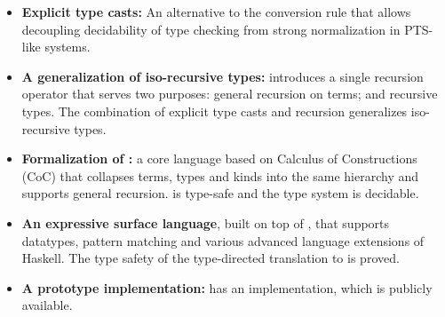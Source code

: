\begin{itemize}
\item {\bf Explicit type casts:} An alternative to the conversion rule
  that allows decoupling decidability of type checking from strong
  normalization in PTS-like systems.

\item {\bf A generalization of iso-recursive types:} \name introduces 
  a single recursion operator that serves two purposes:
  general recursion on terms; and recursive types. The combination of
  explicit type casts and recursion generalizes iso-recursive types.

\item {\bf Formalization of \name:} a core
  language based on Calculus of Constructions (CoC) that collapses
  terms, types and kinds into the same hierarchy and supports general
  recursion. \name is type-safe and the type system is decidable.

\item {\bf An expressive surface language}, built on top of \name,
  that supports datatypes, pattern matching and various advanced
  language extensions of Haskell. The type safety of the type-directed
  translation to \name is proved.

\item {\bf A prototype implementation:} \name has an
  implementation, which is publicly available.
\end{itemize}

